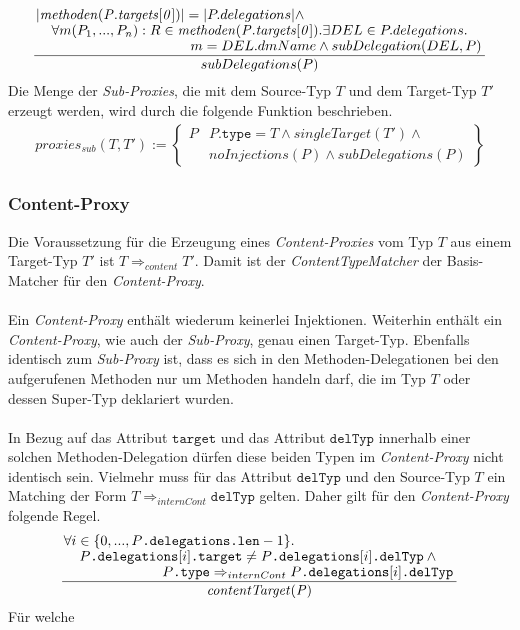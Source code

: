 \documentclass[a4paper,12pt]{article}
\begin{document}
\begin{gather*}
\frac{\splitfrac{|\mathit{methoden(P.targets[0])}| = |P.delegations| \wedge}{ \splitfrac{\forall m(P_1,...,P_n):R \in \mathit{methoden(P.targets[0])}.\exists DEL \in P.delegations.}{m = DEL.dmName \wedge subDelegation(DEL,P)
 }}
}
{subDelegations(P)}
\end{gather*}
Die Menge der \emph{Sub-Proxies}, die mit dem Source-Typ $T$ und dem Target-Typ $T'$ erzeugt werden, wird durch die folgende Funktion beschrieben.
\begin{gather*}
\mathit{proxies_{sub}(T,T')} := 
\left\{\begin{array}{l|l}
	P	& P\texttt{.type} = T \wedge\mathit{singleTarget(T')} \wedge \mathit{ }\\
		& \mathit{noInjections(P)} \wedge \mathit{subDelegations(P)} 
		 \end{array}
\right\}
\end{gather*}


\subsubsection{Content-Proxy}

Die Voraussetzung für die Erzeugung eines \emph{Content-Proxies} vom Typ $T$ aus einem Target-Typ $T'$ ist $T \Rightarrow_{content} T'$. Damit ist der \emph{ContentTypeMatcher} der Basis-Matcher für den \emph{Content-Proxy}.\\\\
Ein \emph{Content-Proxy} enthält wiederum keinerlei Injektionen. Weiterhin enthält ein \emph{Content-Proxy}, wie auch der \emph{Sub-Proxy}, genau einen Target-Typ. Ebenfalls identisch zum \emph{Sub-Proxy} ist, dass es sich in den Methoden-Delegationen bei den aufgerufenen Methoden nur um Methoden handeln darf, die im Typ $T$ oder dessen Super-Typ deklariert wurden.\\\\

In Bezug auf das Attribut $\texttt{target}$ und das Attribut $\texttt{delTyp}$ innerhalb einer solchen Methoden-Delegation dürfen diese beiden Typen im \emph{Content-Proxy} nicht identisch sein. Vielmehr muss für das Attribut $\texttt{delTyp}$ und den Source-Typ $T$ ein Matching der Form $T \Rightarrow_{internCont} \texttt{delTyp}$ gelten. Daher gilt für den \emph{Content-Proxy} folgende Regel.
\begin{gather*}
\frac{
\splitfrac{\forall i \in \{0,...,P\texttt{.delegations.len}-1\}.}
{\splitfrac{P\texttt{.delegations}[i]\texttt{.target} \neq P\texttt{.delegations}[i]\texttt{.delTyp} \wedge \mathit{ }}{ P\texttt{.type} \Rightarrow_{internCont} P\texttt{.delegations}[i]\texttt{.delTyp}}}
}
{\mathit{contentTarget(P)}}
\end{gather*}
\noindent
Für welche 
\end{document}
